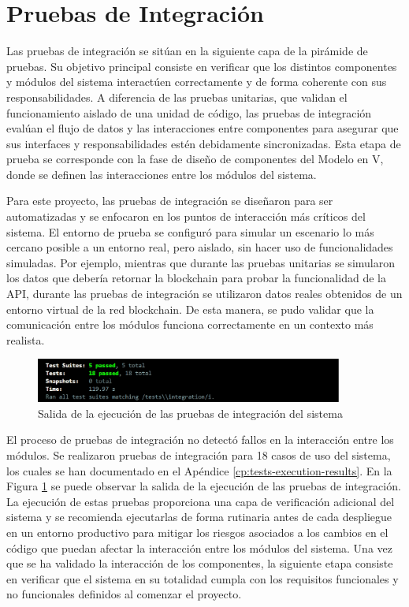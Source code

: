 \section{Pruebas de Integración}
\label{sec:integration-testing}

Las pruebas de integración se sitúan en la siguiente capa de la pirámide de pruebas. Su objetivo principal consiste en verificar que los distintos componentes y módulos del sistema interactúen correctamente y de forma coherente con sus responsabilidades. A diferencia de las pruebas unitarias, que validan el funcionamiento aislado de una unidad de código, las pruebas de integración evalúan el flujo de datos y las interacciones entre componentes para asegurar que sus interfaces y responsabilidades estén debidamente sincronizadas. Esta etapa de prueba se corresponde con la fase de diseño de componentes del Modelo en V, donde se definen las interacciones entre los módulos del sistema.

Para este proyecto, las pruebas de integración se diseñaron para ser automatizadas y se enfocaron en los puntos de interacción más críticos del sistema. El entorno de prueba se configuró para simular un escenario lo más cercano posible a un entorno real, pero aislado, sin hacer uso de funcionalidades simuladas. Por ejemplo, mientras que durante las pruebas unitarias se simularon los datos que debería retornar la blockchain para probar la funcionalidad de la API, durante las pruebas de integración se utilizaron datos reales obtenidos de un entorno virtual de la red blockchain. De esta manera, se pudo validar que la comunicación entre los módulos funciona correctamente en un contexto más realista.

\begin{figure}[!htb]
	\centering
	\includegraphics[width=0.9\textwidth]{Figures/integration-test-results.png}
	\caption{Salida de la ejecución de las pruebas de integración del sistema}
	\label{fig:integration-test-results}
\end{figure}


El proceso de pruebas de integración no detectó fallos en la interacción entre los módulos. Se realizaron pruebas de integración para 18 casos de uso del sistema, los cuales se han documentado en el Apéndice \ref{cp:tests-execution-results}. En la Figura \ref{fig:integration-test-results} se puede observar la salida de la ejecución de las pruebas de integración. La ejecución de estas pruebas proporciona una capa de verificación adicional del sistema y se recomienda ejecutarlas de forma rutinaria antes de cada despliegue en un entorno productivo para mitigar los riesgos asociados a los cambios en el código que puedan afectar la interacción entre los módulos del sistema. Una vez que se ha validado la interacción de los componentes, la siguiente etapa consiste en verificar que el sistema en su totalidad cumpla con los requisitos funcionales y no funcionales definidos al comenzar el proyecto.

